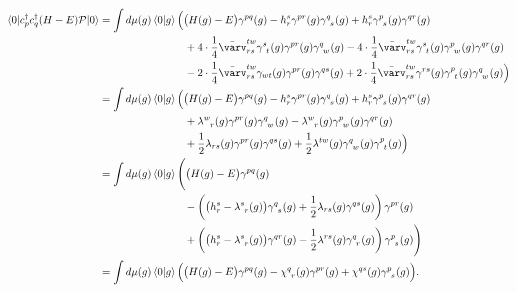\documentclass[11pt,letterpaper]{article}
\begin{document}
%
\begin{subequations}
\begin{align}
  \nonumber
  \braket{0|c^\dag_p c^\dag_q (H - E) \mathcal{P} |0}
  &= \int d\mu(g) \braket{0|g}
  \Bigl(
    \big(H(g) - E\big) \gamma^{pq}(g)
    -h^{s}_{r}\gamma^{pr}(g)\gamma^{q\phantom{s}}_{\phantom{q}s}(g)+h^{s}_{r}\gamma^{p\phantom{s}}_{\phantom{p}s}(g)\gamma^{qr}(g)\\
    \nonumber
    &\hspace{8em}+ 4 \cdot \frac{1}{4}  \bar\varv^{tw}_{rs}\gamma_{\phantom{s}t}^{s\phantom{t}}(g)\gamma^{pr}(g)\gamma_{\phantom{q}w}^{q\phantom{w}}(g) 
    - 4 \cdot \frac{1}{4} \bar\varv^{tw}_{rs}\gamma_{\phantom{s}t}^{s\phantom{t}}(g)\gamma_{\phantom{p}w}^{p\phantom{w}}(g)\gamma^{qr}(g)\\
    &\hspace{8em}- 2 \cdot \frac{1}{4} \bar\varv^{tw}_{rs}\gamma_{wt}(g)\gamma^{pr}(g)\gamma^{qs}(g) 
    + 2 \cdot \frac{1}{4} \bar\varv^{tw}_{rs}\gamma^{rs}(g)\gamma_{\phantom{p}t}^{p\phantom{t}}(g)\gamma_{\phantom{q}w}^{q\phantom{w}}(g)
  \Bigr)\\
  \nonumber
  &= \int d\mu(g) \braket{0|g}
  \Bigl(
    \big(H(g) - E\big) \gamma^{pq}(g)
    -h^{s}_{r}\gamma^{pr}(g)\gamma^{q\phantom{s}}_{\phantom{q}s}(g)+h^{s}_{r}\gamma^{p\phantom{s}}_{\phantom{p}s}(g)\gamma^{qr}(g)\\
    \nonumber
    &\hspace{8em}+ \lambda^{w\phantom{r}}_{\phantom{w}r}(g) 
    \gamma^{pr}(g) \gamma_{\phantom{q}w}^{q\phantom{w}}(g)
    - \lambda^{w\phantom{r}}_{\phantom{w}r}(g) 
    \gamma^{p\phantom{w}}_{\phantom{p}w}(g) \gamma^{qr}(g)\\
    &\hspace{8em}+ \frac{1}{2} \lambda_{rs}(g)
    \gamma^{pr}(g) \gamma^{qs}(g)
    + \frac{1}{2} \lambda^{tw}(g)
    \gamma_{\phantom{q}w}^{q\phantom{w}}(g)
    \gamma_{\phantom{p}t}^{p\phantom{t}}(g)
  \Bigr)\\
  \nonumber
  &= \int d\mu(g) \braket{0|g}
  \Biggl(
    \big(H(g) - E\big) \gamma^{pq}(g)\\
    \nonumber
    &\hspace{8em}
    - \left(
      \big(h_r^s - \lambda^{s\phantom{r}}_{\phantom{s}r}(g)\big)
      \gamma^{q\phantom{s}}_{\phantom{q}s}(g)
      + \frac{1}{2} \lambda_{rs}(g) \gamma^{qs}(g)
    \right)
    \gamma^{pr}(g)\\
    &\hspace{8em}
    + \left(
      \big(h_r^s - \lambda^{s\phantom{r}}_{\phantom{s}r}(g)\big)
      \gamma^{qr}(g)
      - \frac{1}{2} \lambda^{rs}(g) \gamma_{\phantom{q}r}^{q\phantom{r}}(g)
    \right)
    \gamma_{\phantom{p}s}^{p\phantom{s}}(g)
  \Biggr)\\
  &= \int d\mu(g) \braket{0|g}
  \Big(
    \big(H(g) - E\big) \gamma^{pq}(g)
    - \chi^{q\phantom{r}}_{\phantom{q}r}(g) \gamma^{pr}(g)
    + \chi^{qs}(g) \gamma_{\phantom{p}s}^{p\phantom{s}}(g)
  \Big).
\end{align}
\end{subequations}






\end{document}
